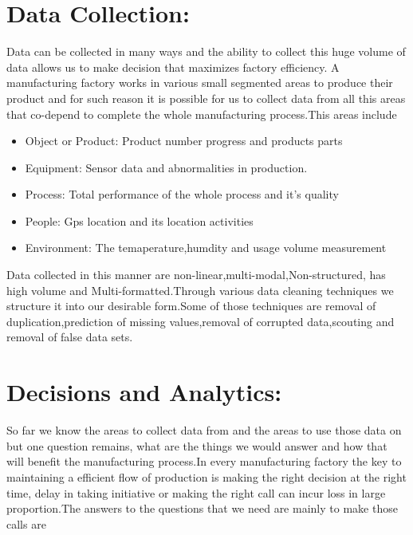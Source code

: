 \documentclass{article}
\begin{document}
\begin{normalsize}
        \section{Data Collection:}
        	Data can be collected in many ways and the ability to collect this huge volume of data allows us to make decision that maximizes factory efficiency. A manufacturing factory works in  various small segmented areas to produce their product and for such reason it is possible for us to collect data from all this areas that co-depend to complete the whole manufacturing process.This areas include 
        	     \begin{itemize}
        
\item{Object or Product: Product number progress and products parts}
\item{Equipment: Sensor data and abnormalities in production. 
} 
\item{Process: Total performance of the whole process and it's quality}
\item{People: Gps location and its location activities}
\item{Environment: The temaperature,humdity and usage volume measurement}
				\end{itemize}
			Data collected in this manner are non-linear,multi-modal,Non-structured, has high volume and Multi-formatted.Through various data cleaning techniques we structure it into our desirable form.Some of those techniques are removal of duplication,prediction of missing values,removal of corrupted data,scouting and removal of false data sets.
				
  		\section{Decisions and Analytics:}
  		So far we know the areas to collect data from and the areas to use those data on but one question remains, what are the things we would answer and how that will benefit the manufacturing process.In every manufacturing factory the key to maintaining a efficient flow of production is making the right decision at the right time, delay in taking initiative or making the right call can incur loss in large proportion.The answers to the questions that we need are mainly to make those calls are 
  		
  		\begin{itemize}
        

\end{itemize}
\end{normalsize}
\end{document}
